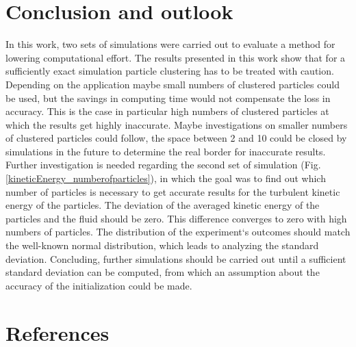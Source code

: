 \documentclass[11pt,a4paper,openany,oneside,parskip=half*]{article}
\begin{document}
\section{Conclusion and outlook}
In this work, two sets of simulations were carried out to evaluate a method for lowering computational effort. 
\newline
The results presented in this work show that for a sufficiently exact simulation particle clustering has to be treated with caution. Depending on the application maybe small numbers of clustered particles could be used, but the savings in computing time would not compensate the loss in accuracy. This is the case in particular high numbers of clustered particles at which the results get highly inaccurate. Maybe investigations on smaller numbers of clustered particles could follow, the space between 2 and 10 could be closed by simulations in the future to determine the real border for inaccurate results. 
\newline
Further investigation is needed regarding the second set of simulation (Fig. \ref{kineticEnergy_numberofparticles}), in which the goal was to find out which number of particles is necessary to get accurate results for the turbulent kinetic energy of the particles. The deviation of the averaged kinetic energy of the particles and the fluid should be zero. This difference converges to zero with high numbers of particles. The distribution of the experiment`s outcomes should match the well-known normal distribution, which leads to analyzing the standard deviation. Concluding, further simulations should be carried out until a sufficient standard deviation can be computed, from which an assumption about the accuracy of the initialization could be made.
\newline
\pagebreak
\section{References}
\nocite{*} %
\pagebreak
\end{document}
